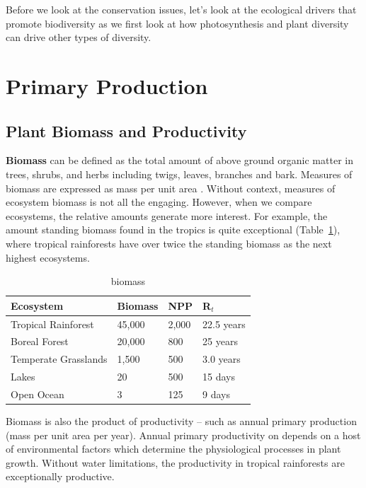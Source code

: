 Before we look at the conservation issues, let's look at the ecological drivers that promote biodiversity as we first look at how photosynthesis and plant diversity can drive other types of diversity. 

\section{Primary Production}

\subsection{Plant Biomass and Productivity}

  \textbf{Biomass} can be defined as the total amount of above ground organic matter in trees, shrubs, and herbs including twigs, leaves, branches and bark. Measures of biomass are expressed as mass per unit area \citep{brown1991biomass}. Without context, measures of ecosystem biomass is not all the engaging. However, when we compare ecosystems, the relative amounts generate more interest. For example, the amount standing biomass found in the tropics is quite exceptional (Table~\ref{tab:biomass}), where tropical rainforests have over twice the standing biomass as the next highest ecosystems. 

\begin{table}[htb]
\centering
		\begin{tabular}{llll}\hline
Ecosystem 						& Biomass	& NPP		& R$_t$ \\ \hline\hline

Tropical Rainforest		& 45,000	& 2,000	& 22.5 years \\
Boreal Forest					& 20,000	& 800		& 25 years \\
Temperate Grasslands	& 1,500		& 500		& 3.0 years \\
Lakes									& 20			& 500		& 15 days\\
Open Ocean						& 3				& 125		& 9 days \\ \hline	
		\end{tabular}
	\caption{biomass}
	\label{tab:biomass}
\end{table}
	
Biomass is also the product of productivity -- such as annual primary production (mass per unit area per year). Annual primary productivity  on depends on a host of environmental factors which determine the physiological processes in plant growth. Without water limitations, the productivity in tropical rainforests are exceptionally productive. 

